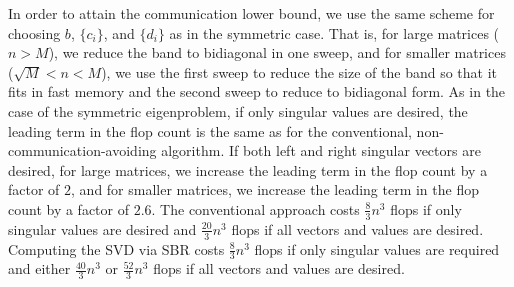 \documentclass{article}
\theoremstyle{definition}
\begin{document}
In order to attain the communication lower bound, we use the same scheme for choosing $b$, $\{c_i\}$, and $\{d_i\}$ as in the symmetric case. That is, for large matrices ($n>M$), we reduce the band to bidiagonal in one sweep, and for smaller matrices ($\sqrt M < n < M$), we use the first sweep to reduce the size of the band so that it fits in fast memory and the second sweep to reduce to bidiagonal form.  As in the case of the symmetric eigenproblem, if only singular values are desired, the leading term in the flop count is the same as for the conventional, non-communication-avoiding algorithm.  If both left and right singular vectors are desired, for large matrices, we increase the leading term in the flop count by a factor of $2$, and for smaller matrices, we increase the leading term in the flop count by a factor of $2.6$.  The conventional approach costs $\frac83 n^3$ flops if only singular values are desired and $\frac{20}{3}n^3$ flops if all vectors and values are desired. Computing the SVD via SBR costs $\frac83 n^3$ flops if only singular values are required and either $\frac{40}{3}n^3$ or $\frac{52}{3}n^3$ flops if all vectors and values are desired.
\end{document}
